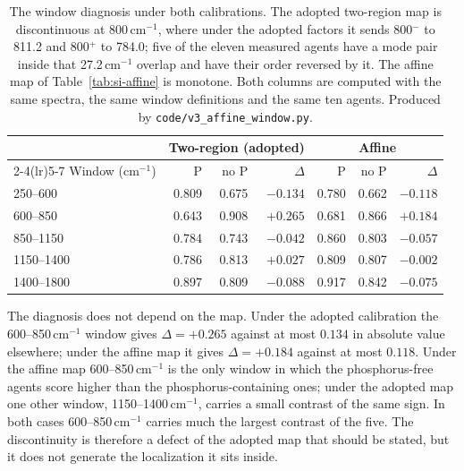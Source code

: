 \documentclass[11pt]{article}
\newcommand*\wn{\ensuremath{\text{cm}^{-1}}}
\begin{document}
\begin{table}[htbp]
\centering
\caption{The window diagnosis under both calibrations. The adopted two-region map is
discontinuous at 800\,\wn{}, where under the adopted factors it sends 800$^-$ to 811.2
and 800$^+$ to 784.0; five of the eleven measured agents have a mode pair inside that
27.2\,\wn{} overlap and have their order reversed by it.
The affine map of Table~\ref{tab:si-affine} is monotone. Both columns are computed with
the same spectra, the same window definitions and the same ten agents. Produced by
\texttt{code/v3\_affine\_window.py}.}
\label{tab:si-affwindow}
\small
\begin{tabular}{lrrrrrr}
\toprule
 & \multicolumn{3}{c}{Two-region (adopted)} & \multicolumn{3}{c}{Affine} \\
\cmidrule(lr){2-4}\cmidrule(lr){5-7}
Window (\wn) & P & no P & $\Delta$ & P & no P & $\Delta$ \\
\midrule
250--600 & 0.809 & 0.675 & $-0.134$ & 0.780 & 0.662 & $-0.118$ \\
600--850 & 0.643 & 0.908 & $+0.265$ & 0.681 & 0.866 & $+0.184$ \\
850--1150 & 0.784 & 0.743 & $-0.042$ & 0.860 & 0.803 & $-0.057$ \\
1150--1400 & 0.786 & 0.813 & $+0.027$ & 0.809 & 0.807 & $-0.002$ \\
1400--1800 & 0.897 & 0.809 & $-0.088$ & 0.917 & 0.842 & $-0.075$ \\
\bottomrule
\end{tabular}

\begin{flushleft}\footnotesize The diagnosis does not depend on the map. Under the
adopted calibration the 600--850\,\wn{} window gives $\Delta = +0.265$ against
at most $0.134$ in absolute value elsewhere; under the affine map it gives
$\Delta = +0.184$ against at most $0.118$. Under the affine map 600--850\,\wn{}
is the only window in which the phosphorus-free agents score higher than the
phosphorus-containing ones; under the adopted map one other window, 1150--1400\,\wn{},
carries a small contrast of the same sign. In both cases 600--850\,\wn{} carries much
the largest contrast of the five. The
discontinuity is therefore a defect of the adopted map that should be stated, but it does
not generate the localization it sits inside.\end{flushleft}
\end{table}
\end{document}
